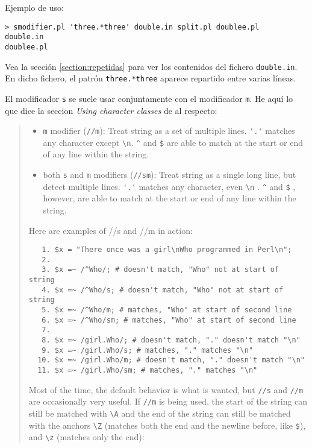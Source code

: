 \noindent Ejemplo de uso:

\begin{verbatim}
> smodifier.pl 'three.*three' double.in split.pl doublee.pl
double.in
doublee.pl 
\end{verbatim}

Vea la sección \ref{section:repetidas} para ver los contenidos 
del fichero \verb|double.in|. En dicho fichero,
el patrón \verb|three.*three| aparece repartido entre
varias líneas.



El modificador \verb|s| se suele usar conjuntamente con el modificador 
\verb|m|. He aquí lo que dice
la seccion {\it Using character classes} de 
al respecto:

\begin{it}
\begin{quotation}
\begin{itemize}
    \item \verb|m| modifier (\verb|//m|): Treat string as a set of multiple lines. 
      \verb|'.'| matches any character except \verb"\n". 
      \verb|^| and \verb|$| are able to match at the start or end of any line within the string.
    \item
      both \verb|s| and \verb|m| modifiers (\verb|//sm|): Treat string as a single long line, but detect multiple lines. 
      \verb|'.'| matches any character, even \verb"\n" . 
      \verb|^| and \verb|$| , however, are able to match at the start or end of any line within the string.
\end{itemize}

Here are examples of //s and //m in action:

\begin{verbatim}
   1. $x = "There once was a girl\nWho programmed in Perl\n";
   2.
   3. $x =~ /^Who/; # doesn't match, "Who" not at start of string
   4. $x =~ /^Who/s; # doesn't match, "Who" not at start of string
   5. $x =~ /^Who/m; # matches, "Who" at start of second line
   6. $x =~ /^Who/sm; # matches, "Who" at start of second line
   7.
   8. $x =~ /girl.Who/; # doesn't match, "." doesn't match "\n"
   9. $x =~ /girl.Who/s; # matches, "." matches "\n"
  10. $x =~ /girl.Who/m; # doesn't match, "." doesn't match "\n"
  11. $x =~ /girl.Who/sm; # matches, "." matches "\n"
\end{verbatim}

Most of the time, the default behavior is what is wanted, but \verb|//s| and
\verb|//m| are occasionally very useful. If \verb|//m| is being used, the start of the
string can still be matched with \verb|\A| and the end of the string can still
be matched with the anchors \verb|\Z| (matches both the end and the newline
before, like \verb|$|), and \verb|\z| (matches only the end):


\end{quotation}
\end{it}
